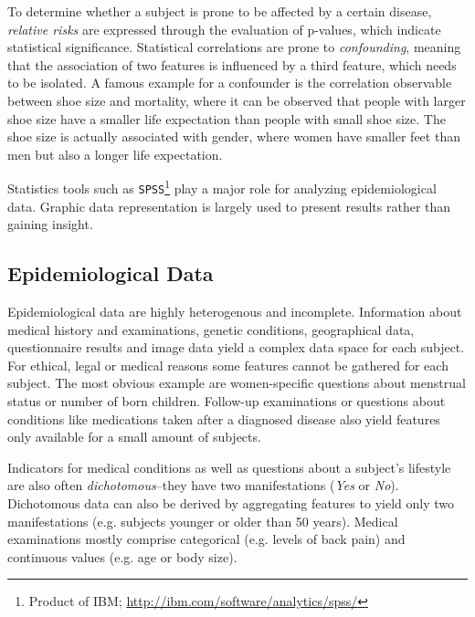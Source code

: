 \documentclass[journal]{style/vgtc} 			          %
\begin{document}
To determine whether a subject is prone to be affected by a certain disease, \emph{relative risks} are expressed through the evaluation of p-values, which indicate statistical significance.
%
Statistical correlations are prone to \emph{confounding}, meaning that the association of two features is influenced by a third feature, which needs to be isolated.
%
A famous example for a confounder is the correlation observable between shoe size and mortality, where it can be observed that people with larger shoe size have a smaller life expectation than people with small shoe size.
%
The shoe size is actually associated with gender, where women have smaller feet than men but also a longer life expectation.
%

Statistics tools such as \texttt{SPSS}\footnote{Product of IBM; \url{http://ibm.com/software/analytics/spss/}} play a major role for analyzing epidemiological data.
%
Graphic data representation is largely used to present results rather than gaining insight.
	
\subsection{Epidemiological Data} \label{EpidemiologicalData}
Epidemiological data are highly heterogenous and incomplete.
%
Information about medical history and examinations, genetic conditions, geographical data, questionnaire results and image data yield a complex data space for each subject.
%
%
For ethical, legal or medical reasons some features cannot be gathered for each subject.
%
The most obvious example are women-specific questions about menstrual status or number of born children.
%
Follow-up examinations or questions about conditions like medications taken after a diagnosed disease also yield features only available for a small amount of subjects.
%

Indicators for medical conditions as well as questions about a subject's lifestyle are also often \emph{dichotomous}--they have two manifestations (\emph{Yes} or \emph{No}).
%
%
Dichotomous data can also be derived by aggregating features to yield only two manifestations (e.g. subjects younger or older than 50 years).
%
Medical examinations mostly comprise categorical (e.g. levels of back pain) and continuous values (e.g. age or body size).
\end{document}
